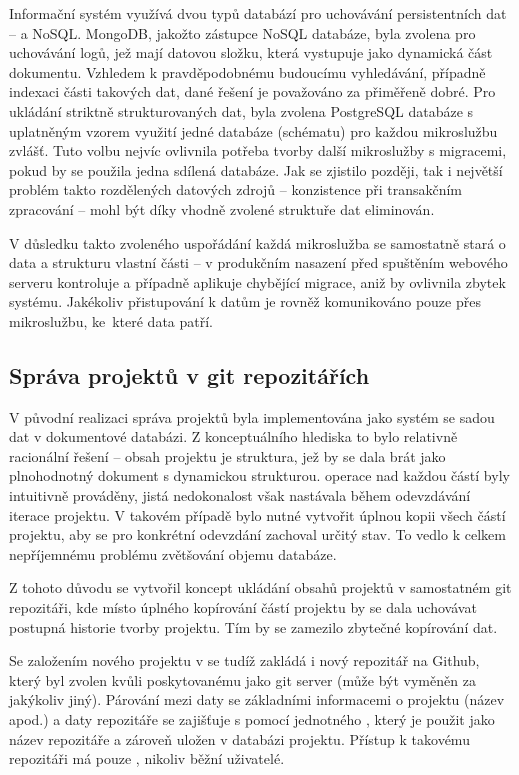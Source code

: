 Informační systém využívá dvou typů databází pro uchovávání persistentních dat –  a NoSQL\@.
MongoDB, jakožto zástupce NoSQL databáze, byla zvolena pro uchovávání logů, jež mají datovou složku, která vystupuje jako dynamická část dokumentu.
Vzhledem k pravděpodobnému budoucímu vyhledávání, případně indexaci části takových dat, dané řešení je považováno za přiměřeně dobré.
Pro ukládání striktně strukturovaných dat, byla zvolena PostgreSQL databáze s uplatněným vzorem využití jedné databáze (schématu) pro každou mikroslužbu zvlášť.
Tuto volbu nejvíc ovlivnila potřeba tvorby další mikroslužby s migracemi, pokud by se použila jedna sdílená databáze.
Jak se zjistilo později, tak i největší problém takto rozdělených datových zdrojů – konzistence při transakčním zpracování – mohl být díky vhodně zvolené struktuře dat eliminován.

V důsledku takto zvoleného uspořádání každá mikroslužba se samostatně stará o data a strukturu vlastní části – v produkčním nasazení před spuštěním webového serveru kontroluje a případně aplikuje chybějící migrace, aniž by ovlivnila zbytek systému.
Jakékoliv přistupování k datům je rovněž komunikováno pouze přes mikroslužbu, ke~které data patří.



\subsection{Správa projektů v git repozitářích}\label{subsec:server-db-github}

V původní realizaci  správa projektů byla implementována jako systém se sadou dat v dokumentové databázi.
Z konceptuálního hlediska to bylo relativně racionální řešení – obsah projektu je  struktura, jež by se dala brát jako plnohodnotný dokument s dynamickou strukturou.
 operace nad každou částí byly intuitivně prováděny, jistá nedokonalost však nastávala během odevzdávání iterace projektu.
V takovém případě bylo nutné vytvořit úplnou kopii všech částí projektu, aby se pro konkrétní odevzdání zachoval určitý stav.
To vedlo k celkem nepříjemnému problému zvětšování objemu databáze.

Z tohoto důvodu se vytvořil koncept ukládání obsahů projektů v samostatném git repozitáři, kde místo úplného kopírování částí projektu by se dala uchovávat postupná historie tvorby projektu.
Tím by se zamezilo zbytečné kopírování dat.

Se založením nového projektu v  se tudíž zakládá i nový repozitář na Github, který byl zvolen kvůli poskytovanému  jako git server (může být vyměněn za jakýkoliv jiný).
Párování mezi daty se základními informacemi o projektu (název apod.) a daty repozitáře se zajišťuje s pomocí jednotného , který je použit jako název repozitáře a zároveň uložen v databázi projektu.
Přístup k takovému repozitáři má pouze , nikoliv běžní uživatelé.

